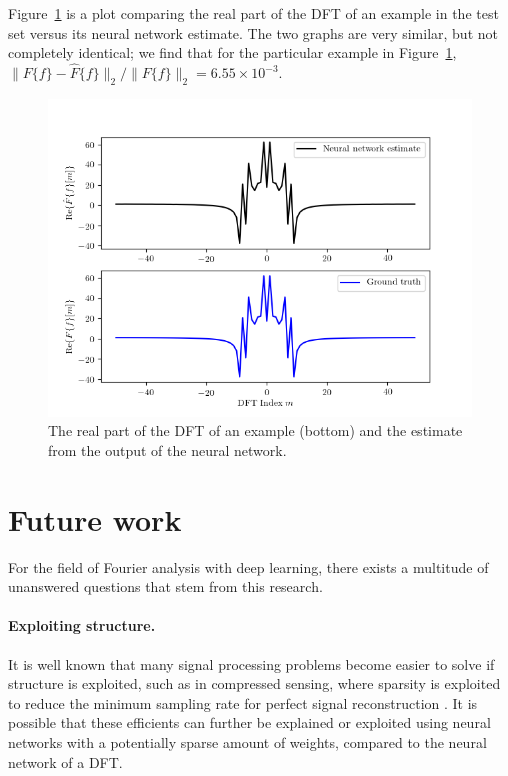 \documentclass[12pt]{article}
\begin{document}
Figure~\ref{f-DFT_compare} is a plot comparing the real part of the DFT of an example in the test set 
versus its neural network estimate. The two graphs are very similar, but not completely identical; we 
find that for the particular example in Figure~\ref{f-DFT_compare}, 
$\|F\{f\} - \hat{F}\{f\}\|_2 / \|F\{f\}\|_2 = 6.55 \times 10^{-3}.$

\begin{figure}
\centering
\includegraphics[scale=.75]{figures/DFT_comparisons.png}
\caption{The real part of the DFT of an example (bottom) and the estimate from the output of the neural network.}
\label{f-DFT_compare}
\end{figure}

\section{Future work}
For the field of Fourier analysis with deep learning, there exists a multitude of unanswered questions that stem from 
this research.

\paragraph{Exploiting structure.} It is well known that many signal processing problems become easier to solve if structure is
exploited, such as in compressed sensing, where sparsity is exploited to reduce the minimum sampling rate for perfect signal
reconstruction \cite{D:06}. It is possible that these efficients can further be explained or exploited using neural networks
with a potentially sparse amount of weights, compared to the neural network of a DFT.
\end{document}
